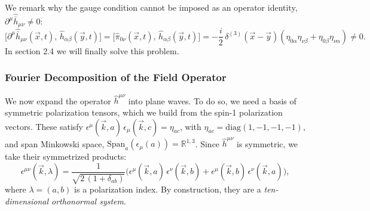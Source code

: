 \documentclass[12pt,a4paper,oneside]{article}
\numberwithin{equation}{section}   %
\begin{document}
We remark why the gauge condition cannot be imposed as an operator identity,
$\partial^\mu \hat{\bar{h}}_{\mu\nu}\neq0$:
\begin{equation}\label{GBC}
    \bigl[\partial^\mu\hat{\bar h}_{\mu\nu}(\vec x,t),\,\hat h_{\alpha\beta}(\vec y,t)\bigr]
    =\bigl[\hat\pi_{0\nu}(\vec x,t),\,\hat h_{\alpha\beta}(\vec y,t)\bigr]
    =-\frac{i}{2}\,\delta^{(3)}(\vec x-\vec y)
    \left(\eta_{0\alpha}\eta_{\nu\beta}+\eta_{0\beta}\eta_{\nu\alpha}\right)\neq0 .
\end{equation}
In section 2.4 we will finally solve this problem.

\subsubsection{Fourier Decomposition of the Field Operator}

We now expand the operator $\hat{h}^{\mu\nu}$ into plane waves. To do so, we
need a basis of symmetric polarization tensors, which we build from the spin-1
polarization vectors. These satisfy
$\epsilon^{\mu}(\vec k,a)\,\epsilon_{\mu}(\vec k,c)=\eta_{ac}$, with
$\eta_{ac}=\mathrm{diag}(1,-1,-1,-1)$, and span Minkowski space,
$\text{Span}_a(\epsilon_\mu(a)) = \mathbb{R}^{1,3}$.
Since $\hat h^{\mu\nu}$ is symmetric, we take their symmetrized products:
\begin{equation}
\epsilon^{\mu\nu}(\vec{k},\lambda)
=\frac{1}{\sqrt{2\,(1+\delta_{ab})}}
\bigl(\epsilon^{\mu}(\vec{k},a)\,\epsilon^{\nu}(\vec{k},b)
+\epsilon^{\mu}(\vec{k},b)\,\epsilon^{\nu}(\vec{k},a)\bigr),
\end{equation}
where $\lambda=(a,b)$ is a polarization index. By construction, they
are a \textit{ten-dimensional orthonormal system}.
\end{document}
